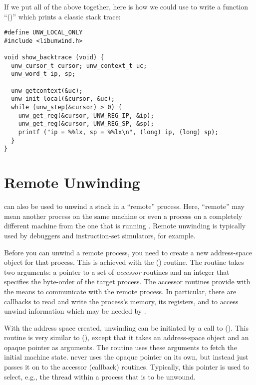 \documentclass{article}
\begin{document}
If we put all of the above together, here is how we could use
 to write a function ``()''
which prints a classic stack trace:

\begin{verbatim}
#define UNW_LOCAL_ONLY
#include <libunwind.h>

void show_backtrace (void) {
  unw_cursor_t cursor; unw_context_t uc;
  unw_word_t ip, sp;

  unw_getcontext(&uc);
  unw_init_local(&cursor, &uc);
  while (unw_step(&cursor) > 0) {
    unw_get_reg(&cursor, UNW_REG_IP, &ip);
    unw_get_reg(&cursor, UNW_REG_SP, &sp);
    printf ("ip = %%lx, sp = %%lx\n", (long) ip, (long) sp);
  }
}
\end{verbatim}


\section{Remote Unwinding}

 can also be used to unwind a stack in a ``remote''
process.  Here, ``remote'' may mean another process on the same
machine or even a process on a completely different machine from the
one that is running .  Remote unwinding is typically
used by debuggers and instruction-set simulators, for example.

Before you can unwind a remote process, you need to create a new
address-space object for that process.  This is achieved with the
() routine.  The routine takes two
arguments: a pointer to a set of \emph{accessor} routines and an
integer that specifies the byte-order of the target process.  The
accessor routines provide  with the means to
communicate with the remote process.  In particular, there are
callbacks to read and write the process's memory, its registers, and
to access unwind information which may be needed by .

With the address space created, unwinding can be initiated by a call
to ().  This routine is very similar to
(), except that it takes an address-space
object and an opaque pointer as arguments.  The routine uses these
arguments to fetch the initial machine state.   never
uses the opaque pointer on its own, but instead just passes it on to
the accessor (callback) routines.  Typically, this pointer is used to
select, e.g., the thread within a process that is to be unwound.
\end{document}
